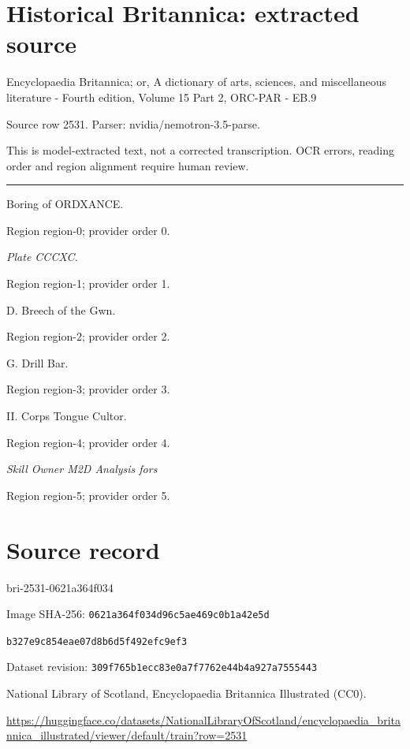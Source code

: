 \documentclass[11pt]{article}
\begin{document}
\section*{Historical Britannica: extracted source}
Encyclopaedia Britannica; or, A dictionary of arts, sciences, and miscellaneous literature - Fourth edition, Volume 15 Part 2, ORC-PAR - EB.9\par
{\small Source row 2531. Parser: nvidia/nemotron-3.5-parse.\par}
{\small This is model-extracted text, not a corrected transcription. OCR errors, reading order and region alignment require human review.\par}
\hrule\medskip
Boring of ORDXANCE.
\par

{\scriptsize\color{gray} Region region-0; provider order 0.\par}
\medskip

{\small\itshape Plate CCCXC.\par}

{\scriptsize\color{gray} Region region-1; provider order 1.\par}
\medskip

D. Breech of the Gwn.
\par

{\scriptsize\color{gray} Region region-2; provider order 2.\par}
\medskip

G. Drill Bar.
\par

{\scriptsize\color{gray} Region region-3; provider order 3.\par}
\medskip

II. Corps Tongue Cultor.
\par

{\scriptsize\color{gray} Region region-4; provider order 4.\par}
\medskip

{\small\itshape Skill Owner M2D Analysis fors\par}

{\scriptsize\color{gray} Region region-5; provider order 5.\par}
\medskip
\newpage\section*{Source record}
bri-2531-0621a364f034\par
Image SHA-256: \texttt{0621a364f034d96c5ae469c0b1a42e5d}\par\texttt{b327e9c854eae07d8b6d5f492efc9ef3}\par
Dataset revision: \texttt{309f765b1ecc83e0a7f7}\texttt{762e44b4a927a7555443}\par
National Library of Scotland, Encyclopaedia Britannica Illustrated (CC0).\par
\url{https://huggingface.co/datasets/NationalLibraryOfScotland/encyclopaedia_britannica_illustrated/viewer/default/train?row=2531}
\end{document}
